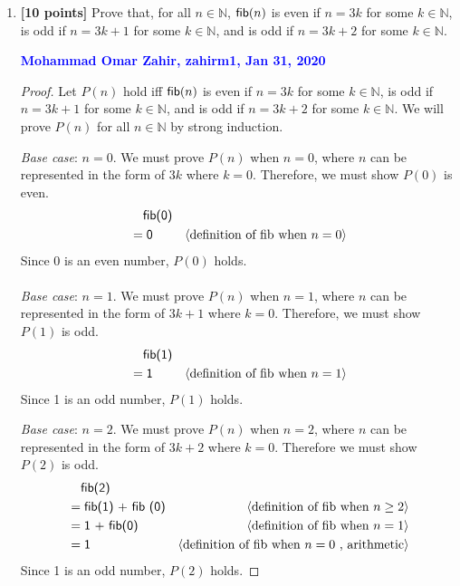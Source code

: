 \documentclass[11pt,fleqn]{article}
\newcommand{\mname}[1]{\mbox{\sf #1}}
\newcommand{\pnote}[1]{{\langle \text{#1} \rangle}}
\begin{document}
\begin{enumerate}
\begin{proof}
    \medskip
    
    Therefore, $P(n)$ holds for all $n \in \mathbb{N}$ by weak induction.
    \end{proof}

  \bigskip

  \item \textbf{[10 points]} Prove that, for all $n \in \mathbb{N}$,
    $\mname{fib}(n)$ is even if $n = 3k$ for some $k \in \mathbb{N}$,
    is odd if $n = 3k + 1$ for some $k \in \mathbb{N}$, and is odd if
    $n = 3k + 2$ for some $k \in \mathbb{N}$.

  \bigskip

  \textcolor{blue}{\textbf{Mohammad Omar Zahir, zahirm1, Jan 31, 2020}}

  \begin{proof}
    Let $P(n)$ hold iff $\mname{fib}(n)$ is even if $n = 3k$ for some $k \in \mathbb{N}$, is odd if $n = 3k + 1$ for some $k \in \mathbb{N}$, and is odd if
    $n = 3k + 2$ for some $k \in \mathbb{N}$.  We will prove
    $P(n)$ for all $n \in \mathbb{N}$ by strong induction.
    
    \medskip
    
    \emph{Base case}: $n = 0$. We must prove $P(n)$ when $n=0$, where $n$ can be represented in the form of $3k$ where $k = 0$. Therefore, we must show $P(0)$ is even.
    \begin{align*}
      &\phantom{{}=} \mname {fib(0)} \\
      &= \mname{0}  & \pnote{definition of fib when $n = 0$}
    \end{align*}
    Since 0 is an even number, $P(0)$ holds.
    \\\\
    \emph{Base case}: $n = 1$. We must prove $P(n)$ when $n=1$, where $n$ can be represented in the form of $3k+1$ where $k = 0$. Therefore, we must show $P(1)$ is odd.
    \begin{align*}
      &\phantom{{}=} \mname {fib(1)} \\
      &= \mname{1}  & \pnote{definition of fib when $n = 1$}
    \end{align*}
    Since 1 is an odd number, $P(1)$ holds.
    
    \emph{Base case}: $n = 2$. We must prove $P(n)$ when $n=2$, where $n$ can be represented in the form of $3k+2$ where $k = 0$. Therefore we must show $P(2)$ is odd.
    \begin{align*}
      &\phantom{{}=} \mname {fib(2)} \\
      &= \mname{fib(1) + fib (0)}  & \pnote{definition of fib when $n \ge 2$}\\
      &= \mname{1 + fib(0)}  & \pnote{definition of fib when $n = 1$}\\
      &= \mname{1}  & \pnote{definition of fib when $n = 0$ , arithmetic}
    \end{align*}
    Since 1 is an odd number, $P(2)$ holds.
    

\end{proof}
\end{enumerate}
\end{document}
